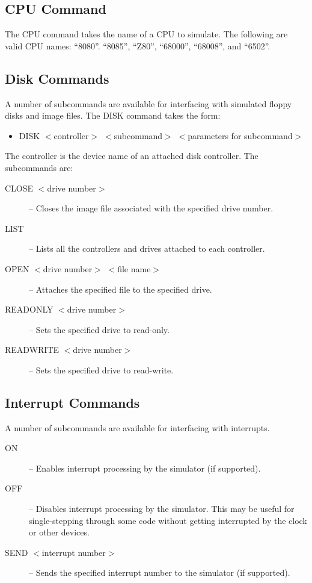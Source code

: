 \documentclass[10pt, openany]{book}
\begin{document}
\subsection{CPU Command}
The CPU command takes the name of a CPU to simulate.  The following are valid CPU names:  ``8080''. ``8085'', ``Z80'', ``68000'', ``68008'', and ``6502''.

\subsection{Disk Commands}
A number of subcommands are available for interfacing with simulated floppy disks and image files.  The DISK command takes the form:
\begin{itemize}
  \item DISK $<$controller$>$ $<$subcommand$>$ $<$parameters for subcommand$>$
\end{itemize}
The controller is the device name of an attached disk controller.  The subcommands are:
\begin{description}
  \item[CLOSE $<$drive number$>$] -- Closes the image file associated with the specified drive number.
  \item[LIST] -- Lists all the controllers and drives attached to each controller.
  \item[OPEN $<$drive number$>$ $<$file name$>$] -- Attaches the specified file to the specified drive.
  \item[READONLY $<$drive number$>$] -- Sets the specified drive to read-only.
  \item[READWRITE $<$drive number$>$] -- Sets the specified drive to read-write.
\end{description}

\subsection{Interrupt Commands}
A number of subcommands are available for interfacing with interrupts.
\begin{description}
  \item[ON] -- Enables interrupt processing by the simulator (if supported).
  \item[OFF] -- Disables interrupt processing by the simulator.  This may be useful for single-stepping through some code without getting interrupted by the clock or other devices.
  \item[SEND $<$interrupt number$>$] --  Sends the specified interrupt number to the simulator (if supported).
\end{description}
\end{document}
